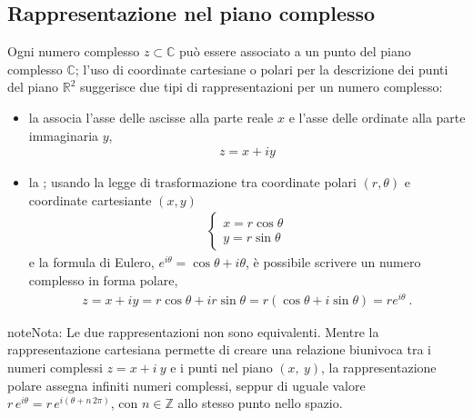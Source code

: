 \documentclass[letterpaper,10pt,italian]{jupyterBook}
\begin{document}
\subsection{Rappresentazione nel piano complesso}
\label{\detokenize{ch/algebra/complex-algebra:rappresentazione-nel-piano-complesso}}
\sphinxAtStartPar
Ogni numero complesso \(z \subset \mathbb{C}\) può essere associato a un punto del piano complesso \(\mathbb{C}\); l’uso di coordinate cartesiane o polari per la descrizione dei punti del piano \(\mathbb{R}^2\) suggerisce due tipi di rappresentazioni per un numero complesso:
\begin{itemize}
\item {} 
\sphinxAtStartPar
la  associa l’asse delle ascisse alla parte reale \(x\) e l’asse delle ordinate alla parte immaginaria \(y\),
\begin{equation*}
\begin{split}z = x + i y\end{split}
\end{equation*}
\item {} 
\sphinxAtStartPar
la ; usando la legge di trasformazione tra coordinate polari \((r, \theta)\) e coordinate cartesiante \((x,y)\)
\begin{equation*}
\begin{split}\begin{cases}
    x = r \cos \theta \\
    y = r \sin \theta
  \end{cases}\end{split}
\end{equation*}
\sphinxAtStartPar
e la formula di Eulero, \(e^{i \theta} = \cos \theta + i \theta\), è possibile scrivere un numero complesso in forma polare,
\begin{equation*}
\begin{split}z = x + i y = r \cos \theta + i r \sin \theta = r \left( \cos \theta + i \sin \theta \right) = r e^{i \theta} \ .\end{split}
\end{equation*}
\end{itemize}

\begin{sphinxadmonition}{note}{Nota:}
\sphinxAtStartPar
Le due rappresentazioni non sono equivalenti. Mentre la rappresentazione cartesiana permette di creare una relazione biunivoca tra i numeri complessi \(z = x + i \ y\) e i punti nel piano \((x, \ y)\), la rappresentazione polare assegna infiniti numeri complessi, seppur di uguale valore \(r \, e^{i \theta} = r \, e^{i (\theta + n \, 2 \pi)}\), con \(n \in \mathbb{Z}\) allo stesso punto nello spazio.
\end{sphinxadmonition}
\end{document}
